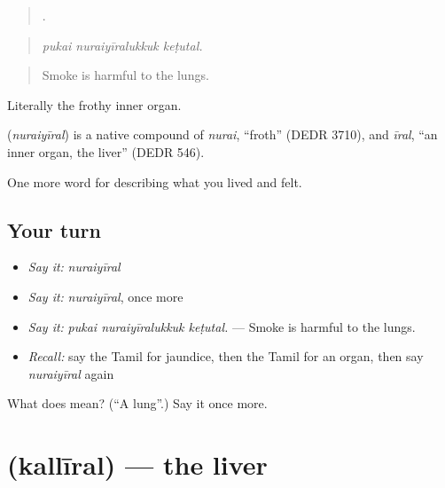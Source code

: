 \begin{quote}
  .
\end{quote}

\begin{quote}
\emph{pukai nuraiyīralukkuk keṭutal.}
\end{quote}

\begin{quote}
Smoke is harmful to the lungs.
\end{quote}

Literally the frothy inner organ.

\begin{cousinweb}
\textbf{} (\emph{nuraiyīral}) is a native compound of  \emph{nurai}, \textquotedblleft{}froth\textquotedblright{} (DEDR 3710), and \emph{īral}, \textquotedblleft{}an inner organ, the liver\textquotedblright{} (DEDR 546).
\end{cousinweb}

\begin{grammarlens}[title={What you've built}]
One more word for describing what you lived and felt.
\end{grammarlens}

\subsection*{Your turn}
\begin{itemize}
\raggedright
  \item \emph{Say it:} \emph{nuraiyīral}
  \item \emph{Say it:} \emph{nuraiyīral}, once more
  \item \emph{Say it:} \emph{pukai nuraiyīralukkuk keṭutal.} — Smoke is harmful to the lungs.
  \item \emph{Recall:} say the Tamil for jaundice, then the Tamil for an organ, then say \emph{nuraiyīral} again
\end{itemize}

\begin{tcolorbox}[breakable,colback=teal!4,colframe=teal!35!black,title={Before you move on}]
What does  mean? (\textquotedblleft{}A lung\textquotedblright{}.) Say it once more.
\end{tcolorbox}
\section[\texorpdfstring{\ta{கல்லீரல்} (kallīral)}{கல்லீரல் (kallīral)}]{ (kallīral) — the liver}

